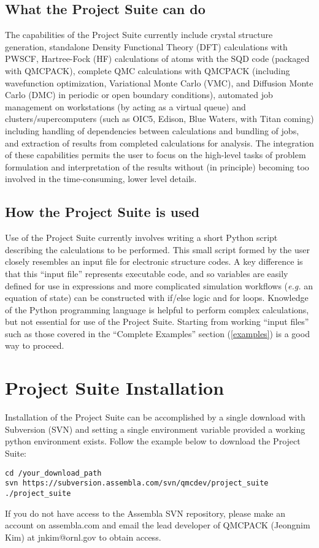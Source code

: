 \documentclass[oneside,11pt]{memoir}
\numberwithin{equation}{section}
\begin{document}
\section{What the Project Suite can do}
The capabilities of the Project Suite currently include crystal structure 
generation, standalone Density Functional Theory (DFT) calculations with PWSCF, 
Hartree-Fock (HF) calculations of atoms with the SQD code (packaged with 
QMCPACK), complete QMC calculations with QMCPACK (including wavefunction 
optimization, Variational Monte Carlo (VMC), and Diffusion Monte Carlo (DMC) in 
periodic or open boundary conditions), automated job management on workstations 
(by acting as a virtual queue) and clusters/supercomputers (such as OIC5, 
Edison, Blue Waters, with Titan coming) including handling of dependencies 
between calculations and bundling of jobs,  and extraction of results from 
completed calculations for analysis.  The integration of these capabilities 
permits the user to focus on the high-level tasks of problem formulation and 
interpretation of the results without (in principle) becoming too involved 
in the time-consuming, lower level details.

\section{How the Project Suite is used}
Use of the Project Suite currently involves writing a short Python script 
describing the calculations to be performed.  This small script formed by the 
user closely resembles an input file for electronic structure codes.  A key 
difference is that this ``input file'' represents executable code, and so 
variables are easily defined for use in expressions and more complicated 
simulation workflows (\emph{e.g.} an equation of state) can be constructed 
with if/else logic and for loops.  Knowledge of the Python programming language 
is helpful to perform complex calculations, but not essential for use of the 
Project Suite.  Starting from working ``input files'' such as those covered 
in the ``Complete Examples'' section (\ref{examples}) is a good way to proceed. 


\pagebreak
\chapter{Project Suite Installation} \label{installation}
Installation of the Project Suite can be accomplished by a single download 
with Subversion (SVN) and setting a single environment variable provided a 
working python environment exists. Follow the example below to download the 
Project Suite:
\begin{shaded}
\begin{verbatim}
cd /your_download_path
svn https://subversion.assembla.com/svn/qmcdev/project_suite ./project_suite
\end{verbatim}
\end{shaded}
If you do not have access to the Assembla SVN repository, please make an 
account on assembla.com and email the lead developer of QMCPACK (Jeongnim Kim) 
at jnkim@ornl.gov to obtain access.
\end{document}
